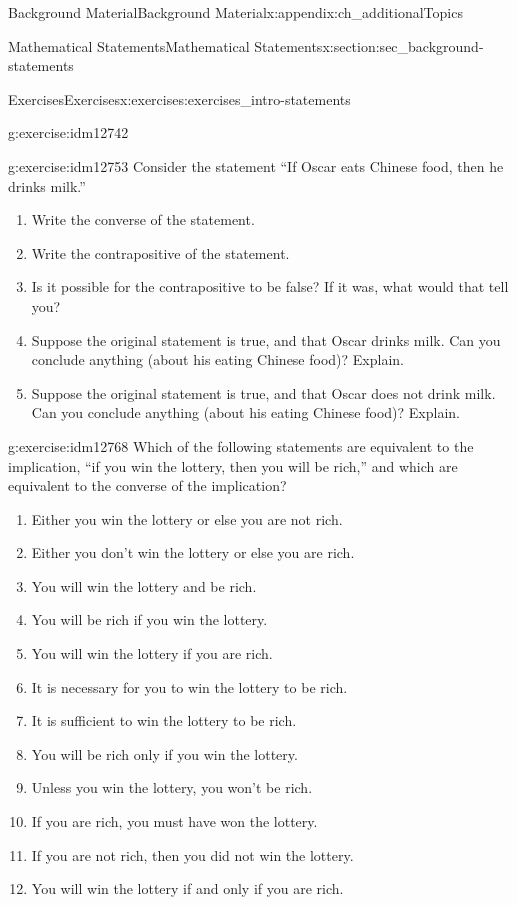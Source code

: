 \documentclass[oneside,10pt,]{book}
\numberwithin{equation}{chapter}
\begin{document}
\begin{appendixptx}{Background Material}{}{Background Material}{}{}{x:appendix:ch_additionalTopics}
\begin{sectionptx}{Mathematical Statements}{}{Mathematical Statements}{}{}{x:section:sec_background-statements}
\begin{exercises-subsection}{Exercises}{}{Exercises}{}{}{x:exercises:exercises_intro-statements}
\begin{divisionexercise}{3}{}{}{g:exercise:idm12742}
\begin{enumerate}[label=(\alph*)]
\end{enumerate}
\end{divisionexercise}%
\begin{divisionexercise}{4}{}{}{g:exercise:idm12753}%
Consider the statement ``If Oscar eats Chinese food, then he drinks milk.''%
%
\begin{enumerate}[label=(\alph*)]
\item{}Write the converse of the statement.%
\item{}Write the contrapositive of the statement.%
\item{}Is it possible for the contrapositive to be false? If it was, what would that tell you?%
\item{}Suppose the original statement is true, and that Oscar drinks milk. Can you conclude anything (about his eating Chinese food)? Explain.%
\item{}Suppose the original statement is true, and that Oscar does not drink milk. Can you conclude anything (about his eating Chinese food)? Explain.%
\end{enumerate}
\end{divisionexercise}%
\begin{divisionexercise}{5}{}{}{g:exercise:idm12768}%
Which of the following statements are equivalent to the implication, ``if you win the lottery, then you will be rich,'' and which are equivalent to the converse of the implication?%
%
\begin{enumerate}[label=(\alph*)]
\item{}Either you win the lottery or else you are not rich.%
\item{}Either you don't win the lottery or else you are rich.%
\item{}You will win the lottery and be rich.%
\item{}You will be rich if you win the lottery.%
\item{}You will win the lottery if you are rich.%
\item{}It is necessary for you to win the lottery to be rich.%
\item{}It is sufficient to win the lottery to be rich.%
\item{}You will be rich only if you win the lottery.%
\item{}Unless you win the lottery, you won't be rich.%
\item{}If you are rich, you must have won the lottery.%
\item{}If you are not rich, then you did not win the lottery.%
\item{}You will win the lottery if and only if you are rich.%

\end{enumerate}
\end{divisionexercise}
\end{exercises-subsection}
\end{sectionptx}
\end{appendixptx}
\end{document}
